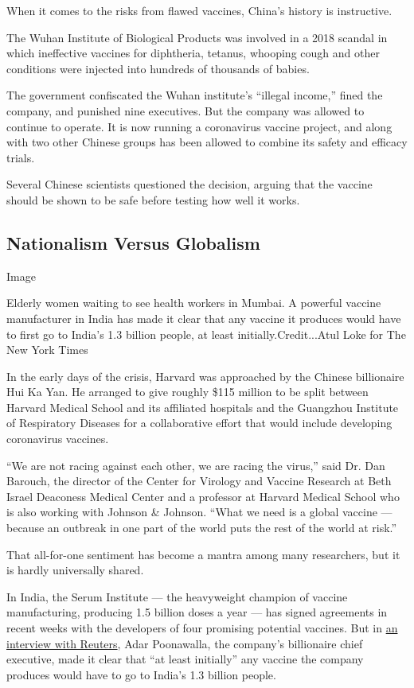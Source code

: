 When it comes to the risks from flawed vaccines, China's history is
instructive.

The Wuhan Institute of Biological Products was involved in a 2018
scandal in which ineffective vaccines for diphtheria, tetanus, whooping
cough and other conditions were injected into hundreds of thousands of
babies.

The government confiscated the Wuhan institute's ``illegal income,''
fined the company, and punished nine executives. But the company was
allowed to continue to operate. It is now running a coronavirus vaccine
project, and along with two other Chinese groups has been allowed to
combine its safety and efficacy trials.

Several Chinese scientists questioned the decision, arguing that the
vaccine should be shown to be safe before testing how well it works.

\hypertarget{nationalism-versus-globalism}{%
\subsection{Nationalism Versus
Globalism}\label{nationalism-versus-globalism}}

Image

Elderly women waiting to see health workers in Mumbai. A powerful
vaccine manufacturer in India has made it clear that any vaccine it
produces would have to first go to India's 1.3 billion people, at least
initially.Credit...Atul Loke for The New York Times

In the early days of the crisis, Harvard was approached by the Chinese
billionaire Hui Ka Yan. He arranged to give roughly \$115 million to be
split between Harvard Medical School and its affiliated hospitals and
the Guangzhou Institute of Respiratory Diseases for a collaborative
effort that would include developing coronavirus vaccines.

``We are not racing against each other, we are racing the virus,'' said
Dr. Dan Barouch, the director of the Center for Virology and Vaccine
Research at Beth Israel Deaconess Medical Center and a professor at
Harvard Medical School who is also working with Johnson \& Johnson.
``What we need is a global vaccine --- because an outbreak in one part
of the world puts the rest of the world at risk.''

That all-for-one sentiment has become a mantra among many researchers,
but it is hardly universally shared.

In India, the Serum Institute --- the heavyweight champion of vaccine
manufacturing, producing 1.5 billion doses a year --- has signed
agreements in recent weeks with the developers of four promising
potential vaccines. But in
\href{https://www.nytimes.com/reuters/2020/04/28/world/europe/28reuters-health-coronavirus-india-vaccine.html}{an
interview with Reuters}, Adar Poonawalla, the company's billionaire
chief executive, made it clear that ``at least initially'' any vaccine
the company produces would have to go to India's 1.3 billion people.

